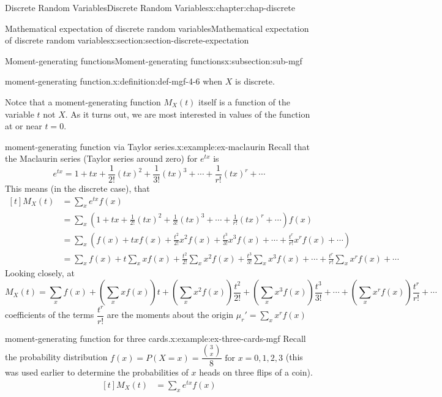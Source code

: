 \documentclass[oneside,10pt,]{book}
\newcommand{\amp}{&}
\begin{document}
\begin{chapterptx}{Discrete Random Variables}{}{Discrete Random Variables}{}{}{x:chapter:chap-discrete}
\begin{sectionptx}{Mathematical expectation of discrete random variables}{}{Mathematical expectation of discrete random variables}{}{}{x:section:section-discrete-expectation}
\begin{subsectionptx}{Moment-generating functions}{}{Moment-generating functions}{}{}{x:subsection:sub-mgf}
\begin{definition}{moment-generating function.}{x:definition:def-mgf-4-6}
when \(X\) is discrete.%
\end{definition}
Notce that a moment-generating function \(\displaystyle M_X(t)\) itself is a function of the variable \(\displaystyle t\) not \(X\). As it turns out, we are most interested in values of the function at or near \(\displaystyle t=0\).%
\begin{example}{moment-generating function via Taylor series.}{x:example:ex-maclaurin}%
Recall that the Maclaurin series (Taylor series around zero) for \(\displaystyle e^{tx}\) is%
\begin{equation*}
e^{tx} = 1 + tx +
\frac{1}{2!}\left(tx\right)^2 + \frac{1}{3!}\left(tx\right)^3 + \cdots +
\frac{1}{r!}\left(tx\right)^r + \cdots
\end{equation*}
This means (in the discrete case), that%
\begin{equation*}
\begin{aligned}[t]
M_X(t) \amp = \sum_x e^{tx} f(x)\\
\amp = \sum_x \left(1 + tx + \frac{1}{2!}(tx)^2 +
\frac{1}{3!}\left(tx\right)^3 + \cdots + \frac{1}{r!}\left(tx\right)^r +
\cdots\right) f(x)\\
\amp = \sum_x (f(x) + txf(x) + \frac{t^2}{2!}x^2f(x) +
\frac{t^3}{3!}x^3f(x) + \cdots + \frac{t^r}{r!}x^rf(x) + \cdots)\\
\amp = \sum_xf(x) + t\sum_x xf(x) + \frac{t^2}{2!}\sum_x x^2f(x) +
\frac{t^3}{3!}\sum_x x^3f(x) + \cdots + \frac{t^r}{r!}\sum_x x^rf(x) +
\cdots
\end{aligned}
\end{equation*}
Looking closely, at%
\begin{equation*}
M_X(t) = \sum_xf(x) + \left(\sum_x xf(x)\right)t
+ \left(\sum_x x^2f(x)\right)\frac{t^2}{2!} + \left(\sum_x
x^3f(x)\right)\frac{t^3}{3!} + \cdots + \left(\sum_x
x^rf(x)\right)\frac{t^r}{r!} + \cdots
\end{equation*}
coefficients of the terms \(\displaystyle \dfrac{t^r}{r!}\) are the moments about the origin \(\displaystyle \mu_r' = \sum_x x^r f(x)\)%
\end{example}
\begin{example}{moment-generating function for three cards.}{x:example:ex-three-cards-mgf}%
Recall the probability distribution \(f(x) = P(X = x) =
\dfrac{{3\choose x}}{8} \text{ for } x = 0, 1, 2, 3\) (this was used earlier to determine the probabilities of \(x\) heads on three flips of a coin).%
\begin{equation*}
\begin{aligned}[t]
M_X(t) \amp = \sum_x e^{tx} f(x)\\

\end{aligned}
\end{equation*}
\end{example}
\end{subsectionptx}
\end{sectionptx}
\end{chapterptx}
\end{document}

